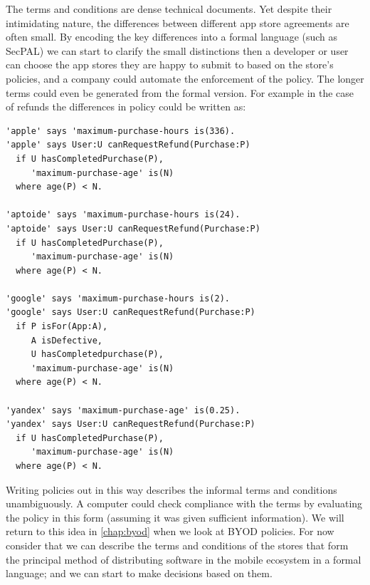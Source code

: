 \documentclass[thesis.tex]{subfiles}
\begin{document}
The terms and conditions are dense technical documents.  Yet despite
their intimidating nature, the differences between different app store
agreements are often small.  By encoding the key differences into a
formal language (such as SecPAL) we can start to clarify the small
distinctions then a developer or user can choose the app stores they
are happy to submit to based on the store's policies, and a company
could automate the enforcement of the policy.  The longer terms could
even be generated from the formal version.  For example in the case of
refunds the differences in policy could be written as:

\begin{lstlisting}
'apple' says 'maximum-purchase-hours is(336).
'apple' says User:U canRequestRefund(Purchase:P)
  if U hasCompletedPurchase(P),
     'maximum-purchase-age' is(N)
  where age(P) < N.

'aptoide' says 'maximum-purchase-hours is(24).
'aptoide' says User:U canRequestRefund(Purchase:P)
  if U hasCompletedPurchase(P),
     'maximum-purchase-age' is(N)
  where age(P) < N.

'google' says 'maximum-purchase-hours is(2).
'google' says User:U canRequestRefund(Purchase:P)
  if P isFor(App:A),
     A isDefective,
     U hasCompletedpurchase(P),
     'maximum-purchase-age' is(N)
  where age(P) < N.

'yandex' says 'maximum-purchase-age' is(0.25).
'yandex' says User:U canRequestRefund(Purchase:P)
  if U hasCompletedPurchase(P),
     'maximum-purchase-age' is(N)
  where age(P) < N.
\end{lstlisting}

Writing policies out in this way describes the informal terms and
conditions unambiguously.  A computer could check compliance with the
terms by evaluating the policy in this form (assuming it was given
sufficient information). We will return to this idea in
\autoref{chap:byod} when we look at BYOD policies.  For now consider
that we can describe the terms and conditions of the stores that form
the principal method of distributing software in the mobile ecosystem
in a formal language; and we can start to make decisions based on them.
\end{document}
